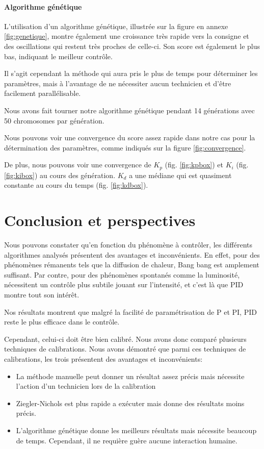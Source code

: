 \documentclass[a4paper,10pt]{report}
\begin{document}
\subsubsection{Algorithme génétique}
L'utilisation d'un algorithme génétique, illustrée sur la figure en annexe \ref{fig:genetique}, montre également une croissance très rapide vers la consigne et des oscillations qui restent très proches de celle-ci.
Son score est également le plus bas, indiquant le meilleur contrôle.

Il s'agit cependant la méthode qui aura pris le plus de temps pour déterminer les paramètres, mais à l'avantage de ne nécessiter aucun technicien et d'être facilement parallélisable.

Nous avons fait tourner notre algorithme génétique pendant 14 générations avec 50 chromosomes par génération.

Nous pouvons voir une convergence du score assez rapide dans notre cas pour la détermination des paramètres, comme indiqués sur la figure \ref{fig:convergence}.

De plus, nous pouvons voir une convergence de $K_p$ (fig. \ref{fig:kpbox}) et $K_i$ (fig. \ref{fig:kibox}) au cours des génération. $K_d$ a une médiane qui est quasiment constante au cours du temps (fig. \ref{fig:kdbox}).


\chapter{Conclusion et perspectives}

Nous pouvons constater qu'en fonction du phénomène à contrôler, les différents algorithmes analysés présentent des avantages et inconvénients.
En effet, pour des phénomènes rémanents tels que la diffusion de chaleur, Bang bang est amplement suffisant.
Par contre, pour des phénomènes spontanés comme la luminosité, nécessitent un contrôle plus subtile jouant sur l'intensité, et c'est là que PID montre tout son intérêt.

Nos résultats montrent que malgré la facilité de paramétrisation de P et PI, PID reste le  plus efficace dans le contrôle.

Cependant, celui-ci doit être bien calibré.
Nous avons donc comparé plusieurs techniques de calibrations.
Nous avons démontré que parmi ces techniques de calibrations, les trois présentent des avantages et inconvénients:
\begin{itemize}
    \item La méthode manuelle peut donner un résultat assez précis mais nécessite l'action d'un technicien lors de la calibration
    \item Ziegler-Nichols est plus rapide a exécuter mais donne des résultats moins précis.
    \item L'algorithme génétique donne les meilleurs résultats mais nécessite beaucoup de temps. Cependant, il ne requière guère aucune interaction humaine.
\end{itemize}
\end{document}
